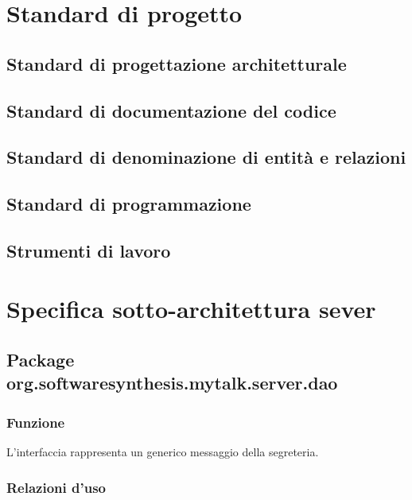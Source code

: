 \section{Standard di progetto}

\subsection{Standard di progettazione architetturale}

\subsection{Standard di documentazione del codice}

\subsection{Standard di denominazione di entità e relazioni}

\subsection{Standard di programmazione}

\subsection{Strumenti di lavoro}

\clearpage

\section{Specifica sotto-architettura sever}\label{sec:serverarchitecture}

\subsection{Package org.softwaresynthesis.mytalk.server.dao}\label{sec:dao}


\subsubsection*{Funzione}
L'interfaccia rappresenta un generico messaggio della segreteria.

\subsubsection*{Relazioni d'uso}

